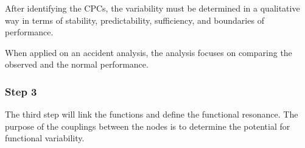After identifying the CPCs, the variability must be determined in a qualitative way in terms of stability, predictability, sufficiency, and boundaries of performance. 




When applied on an accident analysis, the analysis focuses on comparing the observed and the normal performance.


\subsubsection*{Step 3}
The third step will link the functions and define the functional resonance. The purpose of the couplings between the nodes is to determine the potential for functional variability.


